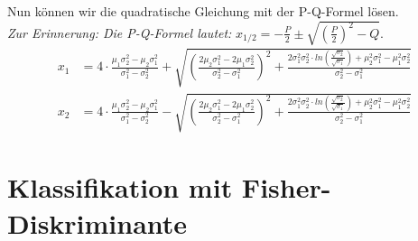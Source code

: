 \documentclass[12pt]{article}
\begin{document}
Nun k\"onnen wir die quadratische Gleichung mit der P-Q-Formel l\"osen.\\
\textit{Zur Erinnerung: Die P-Q-Formel lautet:} $x_{1/2} = -\frac{P}{2} \pm \sqrt{\left(\frac{P}{2}\right)^2 - Q}$.
\begin{align*}
x_1 &= 4 \cdot \frac{\mu_1\sigma_2^2 - \mu_2\sigma_1^2}{\sigma_1^2-\sigma_2^2} + \sqrt{\left( \frac{2\mu_2\sigma_1^2 - 2\mu_1\sigma_2^2}{\sigma_2^2-\sigma_1^2} \right)^2 + \frac{2 \sigma_1^2 \sigma_2^2 \cdot ln \left(\frac{\sqrt{\sigma_2}}{\sqrt{\sigma_1}}\right) + \mu_2^2\sigma_1^2 - \mu_1^2\sigma_2^2}{\sigma_2^2-\sigma_1^2}}\\
x_2 &= 4 \cdot \frac{\mu_1\sigma_2^2 - \mu_2\sigma_1^2}{\sigma_1^2-\sigma_2^2} - \sqrt{\left( \frac{2\mu_2\sigma_1^2 - 2\mu_1\sigma_2^2}{\sigma_2^2-\sigma_1^2} \right)^2 + \frac{2 \sigma_1^2 \sigma_2^2 \cdot ln \left(\frac{\sqrt{\sigma_2}}{\sqrt{\sigma_1}}\right) + \mu_2^2\sigma_1^2 - \mu_1^2\sigma_2^2}{\sigma_2^2-\sigma_1^2}}
\end{align*}
\newpage

\section{Klassifikation mit Fisher-Diskriminante}
\begin{lstlisting}[language=Matlab]
\end{lstlisting}
\newpage
\end{document}
